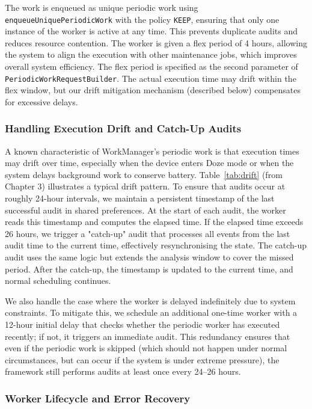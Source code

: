 The work is enqueued as unique periodic work using \texttt{enqueueUniquePeriodicWork} with the policy \texttt{KEEP}, ensuring that only one instance of the worker is active at any time. This prevents duplicate audits and reduces resource contention. The worker is given a flex period of 4 hours, allowing the system to align the execution with other maintenance jobs, which improves overall system efficiency. The flex period is specified as the second parameter of \texttt{PeriodicWorkRequestBuilder}. The actual execution time may drift within the flex window, but our drift mitigation mechanism (described below) compensates for excessive delays.

\subsubsection{Handling Execution Drift and Catch-Up Audits}

A known characteristic of WorkManager's periodic work is that execution times may drift over time, especially when the device enters Doze mode or when the system delays background work to conserve battery. Table~\ref{tab:drift} (from Chapter 3) illustrates a typical drift pattern. To ensure that audits occur at roughly 24-hour intervals, we maintain a persistent timestamp of the last successful audit in shared preferences. At the start of each audit, the worker reads this timestamp and computes the elapsed time. If the elapsed time exceeds 26 hours, we trigger a "catch-up" audit that processes all events from the last audit time to the current time, effectively resynchronising the state. The catch-up audit uses the same logic but extends the analysis window to cover the missed period. After the catch-up, the timestamp is updated to the current time, and normal scheduling continues.

We also handle the case where the worker is delayed indefinitely due to system constraints. To mitigate this, we schedule an additional one-time worker with a 12-hour initial delay that checks whether the periodic worker has executed recently; if not, it triggers an immediate audit. This redundancy ensures that even if the periodic work is skipped (which should not happen under normal circumstances, but can occur if the system is under extreme pressure), the framework still performs audits at least once every 24–26 hours.

\subsubsection{Worker Lifecycle and Error Recovery}


